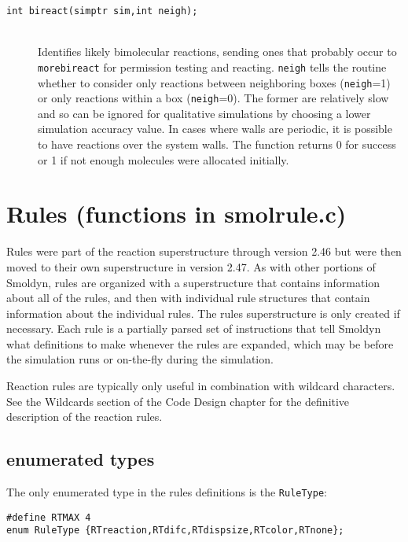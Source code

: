 \documentclass {scrbook}
\newcommand {\ttt} {\texttt}
\begin{document}
\begin{description}
\item[\ttt{int bireact(simptr sim,int neigh);}]
\hfill \\
Identifies likely bimolecular reactions, sending ones that probably occur to \ttt{morebireact} for permission testing and reacting. \ttt{neigh} tells the routine whether to consider only reactions between neighboring boxes (\ttt{neigh}=1) or only reactions within a box (\ttt{neigh}=0). The former are relatively slow and so can be ignored for qualitative simulations by choosing a lower simulation accuracy value. In cases where walls are periodic, it is possible to have reactions over the system walls. The function returns 0 for success or 1 if not enough molecules were allocated initially.

\end{description}

\section{Rules (functions in smolrule.c)}

Rules were part of the reaction superstructure through version 2.46 but were then moved to their own superstructure in version 2.47. As with other portions of Smoldyn, rules are organized with a superstructure that contains information about all of the rules, and then with individual rule structures that contain information about the individual rules. The rules superstructure is only created if necessary. Each rule is a partially parsed set of instructions that tell Smoldyn what definitions to make whenever the rules are expanded, which may be before the simulation runs or on-the-fly during the simulation.

Reaction rules are typically only useful in combination with wildcard characters. See the Wildcards section of the Code Design chapter for the definitive description of the reaction rules.

\subsection*{enumerated types}

The only enumerated type in the rules definitions is the \ttt{RuleType}:

\begin{lstlisting}
#define RTMAX 4
enum RuleType {RTreaction,RTdifc,RTdispsize,RTcolor,RTnone};
\end{lstlisting}
\end{document}
